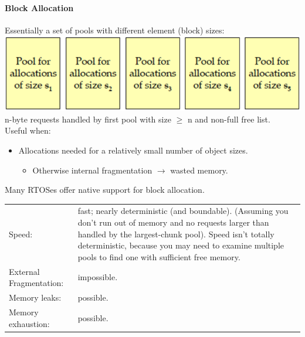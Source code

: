\paragraph{Block Allocation}
Essentially a set of pools with different element (block) sizes:\\
\includegraphics[width=0.5\linewidth]{images/AdvancedCPP/blockAllocation}\\
n-byte requests handled by first pool with size $\geq$ n and non-full free list.\\
Useful when:
\begin{itemize}
  \item Allocations needed for a relatively small number of object sizes.
  \begin{itemize}
    \item Otherwise internal fragmentation $\rightarrow$ wasted memory.
  \end{itemize}
\end{itemize}
Many RTOSes offer native support for block allocation.

\begin{tabular}{|l|p{7cm}|}
  \hline
  Speed: & fast; nearly deterministic (and boundable). (Assuming you don't run out of memory and no requests larger than handled by the largest-chunk pool). Speed isn't totally deterministic, because you may need to examine multiple pools to find one with sufficient free memory.\\
  External Fragmentation: & impossible.\\
  Memory leaks: & possible.\\
  Memory exhaustion: & possible.\\
  \hline
\end{tabular}

